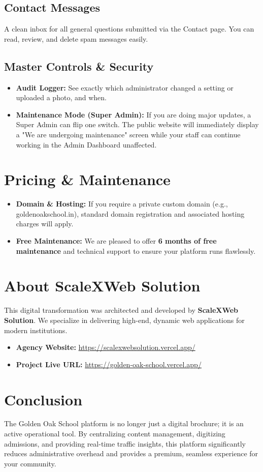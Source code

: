 \documentclass[11pt,a4paper]{article}
\begin{document}
\subsection{Contact Messages}
A clean inbox for all general questions submitted via the Contact page. You can read, review, and delete spam messages easily.

\subsection{Master Controls \& Security}
\begin{itemize}
    \item \textbf{Audit Logger:} See exactly which administrator changed a setting or uploaded a photo, and when.
    \item \textbf{Maintenance Mode (Super Admin):} If you are doing major updates, a Super Admin can flip one switch. The public website will immediately display a "We are undergoing maintenance" screen while your staff can continue working in the Admin Dashboard unaffected.
\end{itemize}

\section{Pricing \& Maintenance}
\begin{itemize}
    \item \textbf{Domain \& Hosting:} If you require a private custom domain (e.g., goldenoakschool.in), standard domain registration and associated hosting charges will apply.
    \item \textbf{Free Maintenance:} We are pleased to offer \textbf{6 months of free maintenance} and technical support to ensure your platform runs flawlessly.
\end{itemize}

\section{About ScaleXWeb Solution}
This digital transformation was architected and developed by \textbf{ScaleXWeb Solution}. We specialize in delivering high-end, dynamic web applications for modern institutions.
\begin{itemize}
    \item \textbf{Agency Website:} \href{https://scalexwebsolution.vercel.app/}{https://scalexwebsolution.vercel.app/}
    \item \textbf{Project Live URL:} \href{https://golden-oak-school.vercel.app/}{https://golden-oak-school.vercel.app/}
\end{itemize}

\section{Conclusion}
The Golden Oak School platform is no longer just a digital brochure; it is an active operational tool. By centralizing content management, digitizing admissions, and providing real-time traffic insights, this platform significantly reduces administrative overhead and provides a premium, seamless experience for your community.
\end{document}
